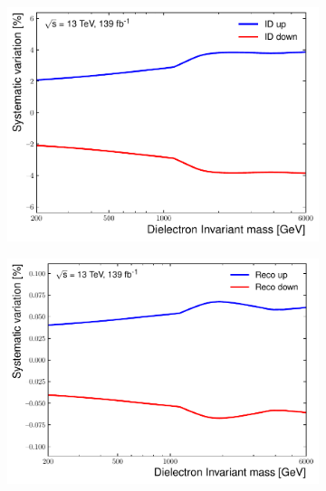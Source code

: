 \begin{figure}[]
\begin{subfigure}[b]{0.42\textwidth}
        \centering
        \includegraphics[width=\textwidth]{figures/analysis/datamc/Uncertainties/exp/ee/m_ee_pstOR_EL_EFF_ID_TOTAL_1NPCOR_PLUS_UNCOR__1up.pdf}
        \label{fig:uncert:eeID}
    \end{subfigure}
    \begin{subfigure}[b]{0.42\textwidth}
        \centering
        \includegraphics[width=\textwidth]{figures/analysis/datamc/Uncertainties/exp/ee/m_ee_pstOR_EL_EFF_Reco_TOTAL_1NPCOR_PLUS_UNCOR__1up.pdf}
        \label{fig:uncert:eeReco}
    \end{subfigure}
    \begin{subfigure}[b]{0.42\textwidth}
        \centering

\end{subfigure}
\end{figure}
